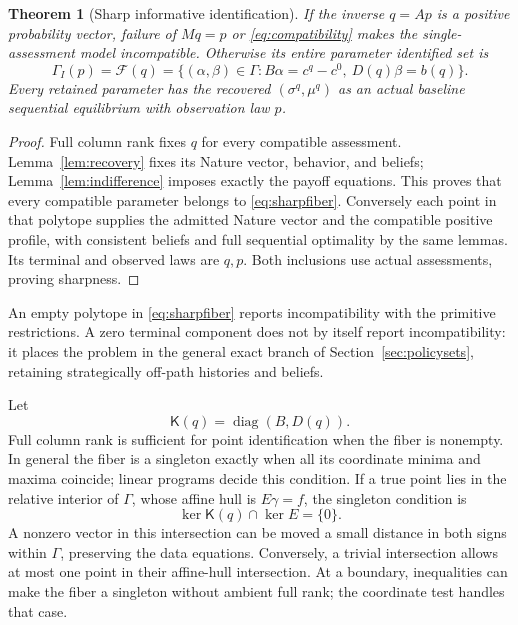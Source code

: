 \documentclass[11pt,a4paper]{article}
\numberwithin{equation}{section}
\newtheorem{theorem}{Theorem}
\theoremstyle{definition}
\DeclareMathOperator{\diag}{diag}
\begin{document}
\begin{theorem}[Sharp informative identification]\label{thm:fiber}
If the inverse \(q=Ap\) is a positive probability vector, failure
of \(Mq=p\) or \eqref{eq:compatibility} makes the single-assessment
model incompatible. Otherwise its entire parameter identified set is
\begin{equation}\label{eq:sharpfiber}
 \Gamma_I(p)=\mathcal F(q)
   =\{(\alpha,\beta)\in\Gamma:
        B\alpha=c^q-c^0,\ D(q)\beta=b(q)\}.
\end{equation}
Every retained parameter has the recovered \((\sigma^q,\mu^q)\)
as an actual baseline sequential equilibrium with observation law \(p\).
\end{theorem}
\begin{proof}
Full column rank fixes \(q\) for every compatible assessment.
Lemma~\ref{lem:recovery} fixes its Nature vector, behavior, and beliefs;
Lemma~\ref{lem:indifference} imposes exactly the payoff equations.
This proves that every compatible parameter belongs to
\eqref{eq:sharpfiber}. Conversely each point in that polytope
supplies the admitted Nature vector and the compatible positive
profile, with consistent beliefs and full sequential optimality
by the same lemmas. Its terminal and observed laws are \(q,p\).
Both inclusions use actual assessments, proving sharpness.
\end{proof}

An empty polytope in \eqref{eq:sharpfiber} reports incompatibility
with the primitive restrictions. A zero terminal component does
not by itself report incompatibility: it places the problem in the
general exact branch of Section~\ref{sec:policysets}, retaining
strategically off-path histories and beliefs.

Let
\begin{equation}\label{eq:operator}
 \mathsf K(q)=\diag(B,D(q)).
\end{equation}
Full column rank is sufficient for point identification when the
fiber is nonempty. In general the fiber is a singleton exactly when
all its coordinate minima and maxima coincide; linear programs decide
this condition. If a true point lies in the relative interior of
\(\Gamma\), whose affine hull is \(E\gamma=f\), the singleton condition is
\begin{equation}\label{eq:relativecriterion}
 \ker\mathsf K(q)\cap\ker E=\{0\}.
\end{equation}
A nonzero vector in this intersection can be moved a small distance
in both signs within \(\Gamma\), preserving the data equations.
Conversely, a trivial intersection allows at most one point in
their affine-hull intersection. At a boundary, inequalities can make
the fiber a singleton without ambient full rank; the coordinate test
handles that case.
\end{document}
